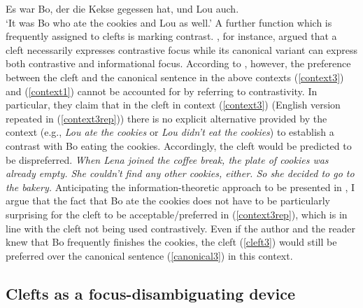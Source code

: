 \documentclass[output=paper,colorlinks,citecolor=brown]{langscibook}
\begin{document}
\ea\label{exh_violation}Es war Bo, der die Kekse gegessen hat, und Lou auch.\\
`It was Bo who ate the cookies and Lou as well.'
\z
A further function which is frequently assigned to clefts is marking contrast. \citet{rochemont_1986}, for instance, argued that a cleft necessarily expresses contrastive focus while its canonical variant can express both contrastive and informational focus. According to \citet{tonnis_tonhauser_2022}, however, the preference between the cleft and the canonical sentence in the above contexts (\ref{context3}) and (\ref{context1}) cannot be accounted for by referring to contrastivity. In particular, they claim that in the cleft in context (\ref{context3}) (English version repeated in (\ref{context3rep})) there is no explicit alternative provided by the context (e.g., \textit{Lou ate the cookies} or \textit{Lou didn't eat the cookies}) to establish a contrast with Bo eating the cookies. Accordingly, the cleft would be predicted to be dispreferred.
\ea\label{context3rep}\textit{When Lena joined the coffee break, the plate of cookies was already empty. She couldn't find any other cookies, either. So she decided to go to the bakery.}
\z
\z
Anticipating the information-theoretic approach to be presented in , I argue that the fact that Bo ate the cookies does not have to be particularly surprising for the cleft to be acceptable/preferred in (\ref{context3rep}), which is in line with the cleft not being used contrastively. Even if the author and the reader knew that Bo frequently finishes the cookies, the cleft (\ref{cleft3}) would still be preferred over the canonical sentence (\ref{canonical3}) in this context.  

\subsection{Clefts as a focus-disambiguating device}\label{subsec:focus_disambiguation}
\end{document}
